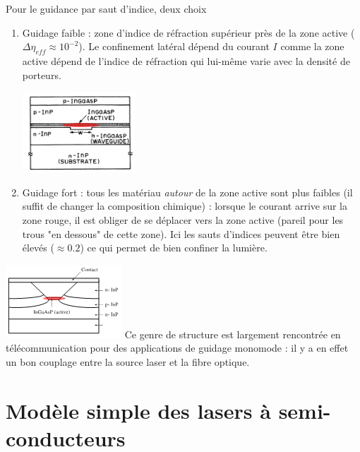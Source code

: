 		Pour le guidance par saut d'indice, deux choix
		\begin{enumerate}
		\item Guidage faible : zone d'indice de réfraction supérieur près de la zone active ($\Delta
		\eta_{eff} \approx 10^{-2}$). Le confinement latéral dépend du courant $I$ comme la zone
		active dépend de l'indice de réfraction qui lui-même varie avec la densité de porteurs.
		\begin{center}
			\includegraphics[scale=0.8]{ch5/image43}
		\end{center}
		\item Guidage fort : tous les matériau \textit{autour} de la zone active sont plus faibles 
		(il suffit de changer la composition chimique) : lorsque le courant arrive sur la zone rouge, 
		il est obliger de se déplacer vers la zone active (pareil pour les trous "en dessous" de 
		cette zone). Ici les sauts d'indices peuvent être bien élevés ($\approx 0.2$) ce qui 
		permet de bien confiner la lumière.
		\end{enumerate}
		\begin{center}
			\includegraphics[scale=0.8]{ch5/image44}
	Ce genre de structure est largement rencontrée en télécommunication pour des applications 
	de guidage monomode : il y a en effet un bon couplage entre la source laser et la fibre optique.
		\end{center}	
	
	
	
\section{Modèle simple des lasers à semi-conducteurs}

